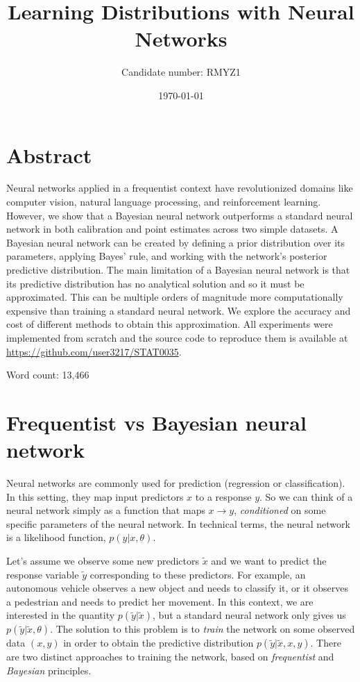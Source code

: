 \documentclass[12pt]{article}
\title{Learning Distributions with Neural Networks}
\author{Candidate number: RMYZ1}
\date{\today}
\begin{document}
\maketitle

\vfill

\section*{Abstract}
Neural networks applied in a frequentist context have revolutionized domains like computer vision, natural language processing, and reinforcement learning. However, we show that a Bayesian neural network outperforms a standard neural network in both calibration and point estimates across two simple datasets. A Bayesian neural network can be created by defining a prior distribution over its parameters, applying Bayes' rule, and working with the network's posterior predictive distribution.  The main limitation of a Bayesian neural network is that its predictive distribution has no analytical solution and so it must be approximated. This can be multiple orders of magnitude more computationally expensive than training a standard neural network. We explore the accuracy and cost of different methods to obtain this approximation. All experiments were implemented from scratch and the source code to reproduce them is available at \url{https://github.com/user3217/STAT0035}.

\vfill

{\centering Word count: 13,466\par}

\vspace{2cm}
\newpage

\tableofcontents
\newpage

\section{Frequentist vs Bayesian neural network}
\label{sec_nn_vs_bnn}

Neural networks are commonly used for prediction (regression or classification). In this setting, they map input predictors $x$ to a response $y$. So we can think of a neural network simply as a function that maps $x \rightarrow y$, \textit{conditioned} on some specific parameters of the neural network. In technical terms, the neural network is a likelihood function, $p(y | x, \theta)$.

Let's assume we observe some new predictors $\tilde{x}$ and we want to predict the response variable $\tilde{y}$ corresponding to these predictors. For example, an autonomous vehicle observes a new object and needs to classify it, or it observes a pedestrian and needs to predict her movement. In this context, we are interested in the quantity $p(\tilde{y} | \tilde{x})$, but a standard neural network only gives us $p(\tilde{y} | \tilde{x}, \theta)$. The solution to this problem is to \textit{train} the network on some observed data $(x, y)$ in order to obtain the predictive distribution $p(\tilde{y} | \tilde{x}, x, y)$. There are two distinct approaches to training the network, based on \textit{frequentist} and \textit{Bayesian} principles.
\end{document}
